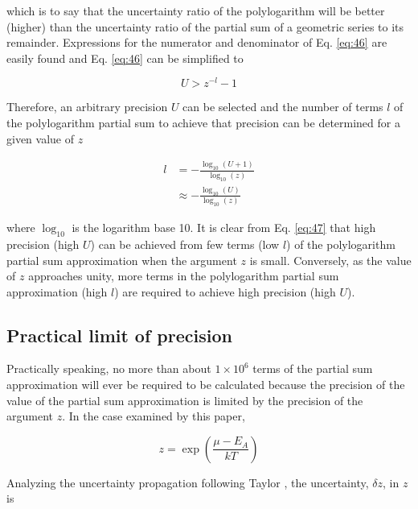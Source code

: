 \documentclass[letterpaper,12pt]{article}
\begin{document}
\noindent which is to say that the uncertainty ratio of the polylogarithm will be better (higher) than the uncertainty ratio of the partial sum of a geometric series to its remainder. Expressions for the numerator and denominator of Eq. \ref{eq:46} are easily found and Eq. \ref{eq:46} can be simplified to

\begin{equation} \label{eq:47}
U > z^{-l} - 1
\end{equation}

\noindent Therefore, an arbitrary precision $U$ can be selected and the number of terms $l$ of the polylogarithm partial sum to achieve that precision can be determined for a given value of $z$

\begin{align} \label{eq:48}
l &= -\frac{\log_{10}(U+ 1)}{\log_{10}(z)} \\
 &\approx -\frac{\log_{10}(U)}{\log_{10}(z)}
\end{align}

\noindent where $\log_{10}$ is the logarithm base 10. It is clear from Eq. \ref{eq:47} that high precision (high $U$) can be achieved from few terms (low $l$) of the polylogarithm partial sum approximation when the argument $z$ is small. Conversely, as the value of $z$ approaches unity, more terms in the polylogarithm partial sum approximation (high $l$) are required to achieve high precision (high $U$). %

\subsection{Practical limit of precision}
Practically speaking, no more than about $1 \times 10^{6}$ terms of the partial sum approximation will ever be required to be calculated because the precision of the value of the partial sum approximation is limited by the precision of the argument $z$. In the case examined by this paper, 

\begin{equation} \label{eq:49}
z = \exp \left( \frac{\mu - E_{A}}{kT} \right)
\end{equation}

Analyzing the uncertainty propagation following Taylor \cite{9780935702422}, the uncertainty, $\delta z$, in $z$ is
\end{document}
